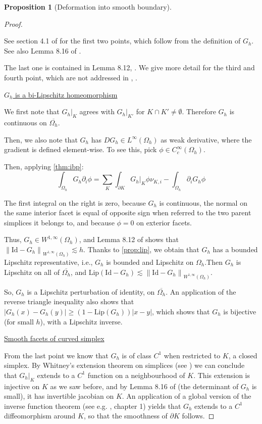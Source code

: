 \documentclass[english,a4paper,9pt,oneside]{scrbook}	%
\theoremstyle{break}
\newtheorem{prop}[equation]{Proposition}
\newenvironment{mproof}[1][\proofname]{%
  \begin{proof}[#1]$ $\par\nobreak\ignorespaces
}{%
  \end{proof}
}
\renewcommand*{\proofname}{Proof}
\theoremstyle{remark}
\newcommand{\norm}[1]{\left\lVert#1\right\rVert}
\newcommand{\id}{\text{Id}}
\begin{document}
\begin{appendices}
\begin{prop}[Deformation into smooth boundary]
\end{prop}
\begin{mproof}

See section 4.1 of \cite{elliott} for the first two points, which follow from the definition of $G_h$. See also Lemma 8.16 of \cite{ranner}.

The last one is contained in Lemma 8.12, \cite{ranner}. We give more detail for the third and fourth point, which are not addressed in \cite{ranner}, \cite{elliott}.

\underline{$G_h$ is a bi-Lipschitz homeomorphism}

We first note that $G_h|_K$ agrees with $G_h|_{K'}$ for $K\cap K' \neq \emptyset$. Therefore $G_h$ is continuous on $\overline{\Omega_h}$.

Then, we also note that $G_h$ has $DG_h \in L^\infty(\Omega_h)$ as weak derivative, where the gradient is defined element-wise. To see this, pick $\phi \in C^\infty_c(\Omega_h)$.

Then, applying \cref{thm:ibp}:
$$\int_{\Omega_h} G_h \partial_i \phi = \sum_K \int_{\partial K}G_h|_{K} \phi \nu_{K,i}  - \int_{\Omega_h}\partial_i G_h \phi$$

The first integral on the right is zero, because $G_h$ is continuous, the normal on the same interior facet is equal of opposite sign when referred to the two parent simplices it belongs to, and because $\phi=0$ on exterior facets.

Thus, $G_h \in W^{1,\infty}(\Omega_h)$, and Lemma 8.12 of \cite{ranner} shows that $\norm{\id -G_h}_{W^{1,\infty}(\Omega_h)}\lesssim h$. Thanks to \cref{prop:lip}, we obtain that $G_h$ has a bounded Lipschitz representative, i.e., $G_h$ is bounded and Lipschitz on $\Omega_h$.Then $G_h$ is Lipschitz on all of $\overline{\Omega_h}$, and $\text{Lip}(\id -G_h) \lesssim  \norm{\id -G_h}_{W^{1,\infty}(\Omega_h)}$.

So, $G_h$ is a Lipschitz perturbation of identity, on $\overline{\Omega_h}$.  An application of the reverse triangle inequality also shows that $|G_h(x)-G_h(y)|\geq (1-\text{Lip}(G_h))|x-y|$, which shows that $G_h$ is bijective (for small $h$), with a Lipschitz inverse.



\underline{Smooth facets of curved simplex}

From the last point we know that $G_h$ is of class $C^1$ when restricted to $K$, a closed simplex. By Whitney's extension theorem on simplices (see \cite{whitney}) we can conclude that $G_h|_K$ extends to a $C^1$ function on a neighbourhood of $K$. This extension is injective on $K$ as we saw before, and by Lemma 8.16 of \cite{ranner} (the determinant of $G_h$ is small), it has invertible jacobian on $K$. An application of a global version of the inverse function theorem (see e.g. \cite{pollack}, chapter 1) yields that $G_h$ extends to a $C^1$ diffeomorphism around $K$, so that the smoothness of $\partial K$ follows.
\end{mproof}


\end{appendices}
\end{document}
